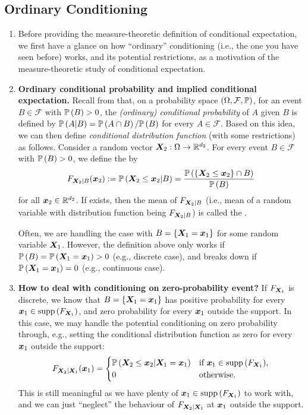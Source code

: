 \subsection{Ordinary Conditioning}
\begin{enumerate}
\item Before providing the measure-theoretic definition of conditional
expectation, we first have a glance on how ``ordinary'' conditioning (i.e., the
one you have seen before) works, and its potential restrictions, as a
motivation of the measure-theoretic study of conditional expectation.
\item \textbf{Ordinary conditional probability and implied conditional
expectation.} Recall from  that, on a
probability space \((\Omega,\mathcal{F},\mathbb{P})\), for an event
\(B\in\mathcal{F}\) with \(\mathbb{P}\left(B\right)>0\), the \emph{(ordinary) conditional
probability} of \(A\) given \(B\) is defined by \(\mathbb{P}\left(A|B\right)=\mathbb{P}\left(A\cap
B\right)/\mathbb{P}\left(B\right)\) for every \(A\in\mathcal{F}\). Based on this idea, we can then
define \emph{conditional distribution function} (with some restrictions) as
follows. Consider a random vector \(\bm{X}_2:\Omega\to\mathbb{R}^{d_{2}}\). For every
event \(B\in\mathcal{F}\) with \(\mathbb{P}\left(B\right)>0\), we define the  by
\[
F_{\bm{X}_2|B}(\bm{x}_2):=\mathbb{P}\left(\bm{X}_2\le\bm{x}_2|B\right)
=\frac{\mathbb{P}\left(\{\bm{X}_2\le\bm{x}_2\}\cap B\right)}{\mathbb{P}\left(B\right)}
\]
for all \(\bm{x}_2\in\mathbb{R}^{d_2}\). If exists, then the mean of
\(F_{\bm{X}_2|B}\) (i.e., mean of a random variable with distribution
function being \(F_{\bm{X}_2|B}\)) is called the .

Often, we are handling the case with \(B=\{\bm{X}_1=\bm{x}_1\}\) for some
random variable \(\bm{X}_1\). However, the definition above only works
if \(\mathbb{P}\left(B\right)=\mathbb{P}\left(\bm{X}_1=\bm{x}_1\right)>0\) (e.g., discrete case), and
breaks down if \(\mathbb{P}\left(\bm{X}_1=\bm{x}_1\right)=0\) (e.g., continuous case).
\item \textbf{How to deal with conditioning on zero-probability
event?}
If \(F_{\bm{X}_1}\) is discrete, we know that
\(B=\{\bm{X}_1=\bm{x}_1\}\) has positive probability for every
\(\bm{x}_1\in\operatorname{supp}\left(F_{\bm{X}_1}\right)\), and zero probability for every
\(\bm{x}_1\) outside the support. In this case, we may handle the potential
conditioning on zero probability through, e.g., setting the conditional
distribution function as zero for every \(\bm{x}_1\) outside the support:
\[
F_{\bm{X}_2|\bm{X}_1}(\bm{x}_1)=
\begin{cases}
\mathbb{P}\left(\bm{X}_2\le\bm{x}_2|\bm{X}_1=\bm{x}_1\right)&\text{if \(\bm{x}_1\in\operatorname{supp}\left(F_{\bm{X}_1}\right)\),} \\
0&\text{otherwise.}
\end{cases}
\]
This is still meaningful as we have plenty of
\(\bm{x}_1\in\operatorname{supp}\left(F_{\bm{X}_1}\right)\) to work with, and we can just
``neglect'' the behaviour of \(F_{\bm{X}_2|\bm{X}_1}\) at \(\bm{x}_1\)
outside the support.


\end{enumerate}
